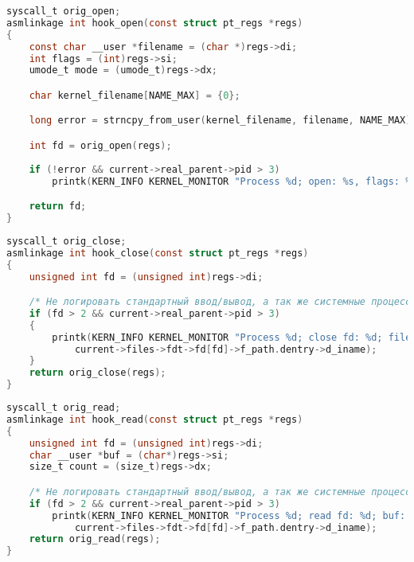     \begin{lstlisting}[language=C, label=lst:syscall-hooking:open, caption=Функция-обёртка системного вызова open]
syscall_t orig_open;
asmlinkage int hook_open(const struct pt_regs *regs)
{
    const char __user *filename = (char *)regs->di;
    int flags = (int)regs->si;
    umode_t mode = (umode_t)regs->dx;

    char kernel_filename[NAME_MAX] = {0};

    long error = strncpy_from_user(kernel_filename, filename, NAME_MAX);

    int fd = orig_open(regs);
        
    if (!error && current->real_parent->pid > 3)
        printk(KERN_INFO KERNEL_MONITOR "Process %d; open: %s, flags: %x; mode: %x; fd: %d\n", current->pid, kernel_filename, flags, mode, fd);

    return fd;
}
    \end{lstlisting}

    \begin{lstlisting}[language=C, label=lst:syscall-hooking:close, caption=Функция-обёртка системного вызова close]
syscall_t orig_close;
asmlinkage int hook_close(const struct pt_regs *regs)
{
    unsigned int fd = (unsigned int)regs->di;

    /* Не логировать стандартный ввод/вывод, а так же системные процессы */
    if (fd > 2 && current->real_parent->pid > 3)
    {        
        printk(KERN_INFO KERNEL_MONITOR "Process %d; close fd: %d; filename: %s\n", current->pid, fd, 
            current->files->fdt->fd[fd]->f_path.dentry->d_iname);
    }
    return orig_close(regs);
}
    \end{lstlisting}

    \begin{lstlisting}[language=C, label=lst:syscall-hooking:read, caption=Функция-обёртка системного вызова read]
syscall_t orig_read;
asmlinkage int hook_read(const struct pt_regs *regs)
{
    unsigned int fd = (unsigned int)regs->di;
    char __user *buf = (char*)regs->si;
    size_t count = (size_t)regs->dx;

    /* Не логировать стандартный ввод/вывод, а так же системные процессы */
    if (fd > 2 && current->real_parent->pid > 3)
        printk(KERN_INFO KERNEL_MONITOR "Process %d; read fd: %d; buf: %p; count: %ld; filename: %s\n", current->pid, fd, buf, count,
            current->files->fdt->fd[fd]->f_path.dentry->d_iname);
    return orig_read(regs);
}
    \end{lstlisting}

